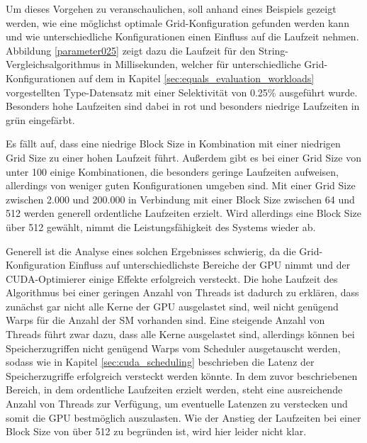 Um dieses Vorgehen zu veranschaulichen, soll anhand eines Beispiels gezeigt werden, wie eine möglichst optimale Grid-Konfiguration gefunden werden kann und wie unterschiedliche Konfigurationen einen Einfluss auf die Laufzeit nehmen.
Abbildung \ref{parameter025} zeigt dazu die Laufzeit für den String-Vergleichsalgorithmus in Millisekunden, welcher für unterschiedliche Grid-Konfigurationen auf dem in Kapitel \ref{sec:equals_evaluation_workloads} vorgestellten Type-Datensatz mit einer Selektivität von 0.25\% ausgeführt wurde.
Besonders hohe Laufzeiten sind dabei in rot und besonders niedrige Laufzeiten in grün eingefärbt.

Es fällt auf, dass eine niedrige Block Size in Kombination mit einer niedrigen Grid Size zu einer hohen Laufzeit führt.
Außerdem gibt es bei einer Grid Size von unter 100 einige Kombinationen, die besonders geringe Laufzeiten aufweisen, allerdings von weniger guten Konfigurationen umgeben sind.
Mit einer Grid Size zwischen 2.000 und 200.000 in Verbindung mit einer Block Size zwischen 64 und 512 werden generell ordentliche Laufzeiten erzielt.
Wird allerdings eine Block Size über 512 gewählt, nimmt die Leistungsfähigkeit des Systems wieder ab.

Generell ist die Analyse eines solchen Ergebnisses schwierig, da die Grid-Konfiguration Einfluss auf unterschiedlichste Bereiche der GPU nimmt und der CUDA-Optimierer einige Effekte erfolgreich versteckt.
Die hohe Laufzeit des Algorithmus bei einer geringen Anzahl von Threads ist dadurch zu erklären, dass zunächst gar nicht alle Kerne der GPU ausgelastet sind, weil nicht genügend Warps für die Anzahl der SM vorhanden sind.
Eine steigende Anzahl von Threads führt zwar dazu, dass alle Kerne ausgelastet sind, allerdings können bei Speicherzugriffen nicht genügend Warps vom Scheduler ausgetauscht werden, sodass wie in Kapitel \ref{sec:cuda_scheduling} beschrieben die Latenz der Speicherzugriffe erfolgreich versteckt werden könnte.
In dem zuvor beschriebenen Bereich, in dem ordentliche Laufzeiten erzielt werden, steht eine ausreichende Anzahl von Threads zur Verfügung, um eventuelle Latenzen zu verstecken und somit die GPU bestmöglich auszulasten.
Wie der Anstieg der Laufzeiten bei einer Block Size von über 512 zu begründen ist, wird hier leider nicht klar.

